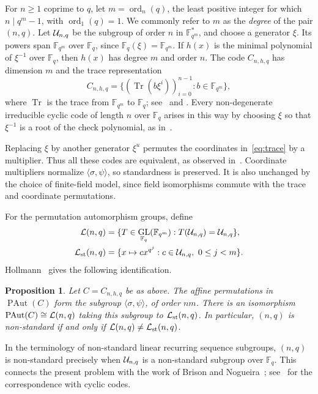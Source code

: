 \documentclass[11pt]{article}
\newtheorem{prop}[teor]{Proposition}
\newcommand{\F}{{\mathbb{F}}}
\newcommand{\cL}{{\cal L}}
\newcommand{\cU}{{\cal U}}
\DeclareMathOperator{\ord}{ord}
\DeclareMathOperator{\PAut}{PAut}
\DeclareMathOperator{\GL}{GL}
\DeclareMathOperator{\Tr}{Tr}
\begin{document}
For $n\ge1$ coprime to $q$, let $m=\ord_n(q)$, the least positive
integer for which $n\mid q^m-1$, with $\ord_1(q)=1$.
We commonly refer to $m$ as the \emph{degree} of the pair $(n,q)$.
Let $\cU_{n,q}$ be the subgroup of order $n$ in $\F_{q^m}^*$,
and choose a generator $\xi$. Its powers span $\F_{q^m}$ over
$\F_q$, since $\F_q(\xi)=\F_{q^m}$. If $h(x)$ is the minimal
polynomial of $\xi^{-1}$ over $\F_q$, then $h(x)$ has degree $m$
and order $n$. The code $C_{n,h,q}$ has dimension $m$ and the
trace representation
\begin{equation}\label{eq:trace}
 C_{n,h,q}=
 \{(\Tr(b\xi^i))_{i=0}^{n-1}:
       b\in\F_{q^m}\},
\end{equation}
where $\Tr$ is the trace from $\F_{q^m}$ to $\F_q$;
see~\cite[Section 3.4.3]{Charpin} and
\cite[Theorem 5.25]{PlessHuffmanBrualdi}. Every non-degenerate
irreducible cyclic code of length $n$ over $\F_q$ arises in this
way by choosing $\xi$ so that $\xi^{-1}$ is a root of the check polynomial, as in~\cite[Section 2.5]{FHLX}.

Replacing $\xi$ by another generator $\xi^u$ permutes the
coordinates in~\eqref{eq:trace} by a multiplier. Thus all these
codes are equivalent, as observed
in~\cite[Proposition 5.19]{HollmannI}. Coordinate multipliers
normalize $\langle\sigma,\psi\rangle$, so standardness is
preserved. It is also unchanged by the choice of finite-field
model, since field isomorphisms commute with the trace and
coordinate permutations.

For the permutation automorphism groups, define
\[
\begin{aligned}
 \cL(n,q)&=\{T\in\GL_{\F_q}(\F_{q^m}):
                T(\cU_{n,q})=\cU_{n,q}\},\\
 \cL_{\rm st}(n,q)
 &=\{x\mapsto c x^{q^j}:c\in\cU_{n,q},\ 0\le j<m\}.
\end{aligned}
\]
Hollmann~\cite[Corollary 5.14 and Theorem 5.15]{HollmannI} gives
the following identification.

\begin{prop}\label{prop:linear-model}
Let $C=C_{n,h,q}$ be as above. The affine permutations in
$\PAut(C)$ form the subgroup $\langle\sigma,\psi\rangle$,
of order $nm$. There is an isomorphism $\PAut(C)\cong\cL(n,q)$
taking this subgroup to $\cL_{\rm st}(n,q)$. In particular,
$(n,q)$ is non-standard if and only if $\cL(n,q)\ne\cL_{\rm st}(n,q)$.
\end{prop}
In the terminology of non-standard linear recurring sequence
subgroups, $(n,q)$ is non-standard precisely when $\cU_{n,q}$
is a non-standard subgroup over $\F_q$. This connects the present
problem with the work of Brison and Nogueira~\cite{BrisonNogueira};
see~\cite{HollmannI} for the correspondence with cyclic codes.
\end{document}
